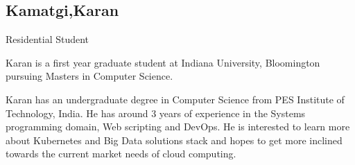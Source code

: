 
\subsection{Kamatgi,Karan}

Residential Student

Karan is a first year graduate student at Indiana University, Bloomington 
pursuing Masters in Computer Science. 

Karan has an undergraduate degree in Computer Science from PES Institute of 
Technology, India. 
He has around 3 years of experience in the Systems programming domain,
Web scripting and DevOps.
He is interested to learn more about Kubernetes and Big Data solutions 
stack and hopes to get more inclined towards the current market needs of cloud 
computing.


